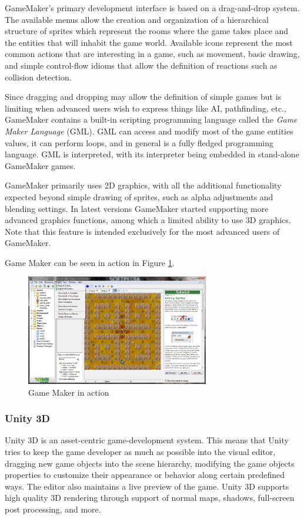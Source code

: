 GameMaker's primary development interface is based on a drag-and-drop system. The available menus allow the creation and organization of a hierarchical structure of sprites which represent the rooms where the game takes place and the entities that will inhabit the game world. Available icons represent the most common actions that are interesting in a game, such as movement, basic drawing, and simple control-flow idioms that allow the definition of reactions such as collision detection.

Since dragging and dropping may allow the definition of simple games but is limiting when advanced users wish to express things like AI, pathfinding, etc., GameMaker contains a built-in scripting programming language called the \textit{Game Maker Language} (GML). GML can access and modify most of the game entities values, it can perform loops, and in general is a fully fledged programming language. GML is interpreted, with its interpreter being embedded in stand-alone GameMaker games.

GameMaker primarily uses 2D graphics, with all the additional functionality expected beyond simple drawing of sprites, such as alpha adjustments and blending settings. In latest versions GameMaker started supporting more advanced graphics functions, among which a limited ability to use 3D graphics.  Note that this feature is intended exclusively for the most advanced users of GameMaker.

Game Maker can be seen in action in Figure \ref{fig:game_maker_in_action}.

\begin{figure}
\begin{center}
\includegraphics[width=8cm]{Pics/gamemaker1.png}
\end{center}
\caption{Game Maker in action}
\label{fig:game_maker_in_action}
\end{figure}

\subsubsection{Unity 3D}
Unity 3D is an asset-centric game-development system. This means that Unity tries to keep the game developer as much as possible into the visual editor, dragging new game objects into the scene hierarchy, modifying the game objects properties to customize their appearance or behavior along certain predefined ways. The editor also maintains a live preview of the game. Unity 3D supports high quality 3D rendering through support of normal maps, shadows, full-screen post processing, and more.

